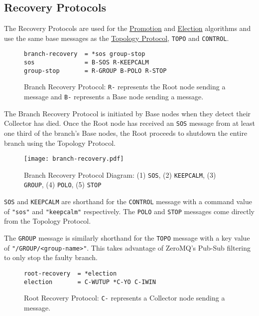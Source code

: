 \subsection{Recovery Protocols}
\label{proto_reco}

The \dcamp Recovery Protocols are used for the \hyperref[algor_promo]{Promotion} and \hyperref[algor_elect]{Election}
algorithms and use the same base messages as the \hyperref[proto_topo]{Topology Protocol}, \texttt{TOPO} and
\texttt{CONTROL}.

\begin{figure}[H]
\vspace{+10pt}
\begin{verbatim}
branch-recovery  = *sos group-stop
sos              = B-SOS R-KEEPCALM
group-stop       = R-GROUP B-POLO R-STOP
\end{verbatim}
\vspace{-5pt}
\caption[Branch Recovery Protocol]
	{Branch Recovery Protocol: \texttt{R-} represents the Root node sending a message and \texttt{B-} represents a
	 Base node sending a message.}
\label{fig:proto_reco_branch_spec}
\end{figure}

The Branch Recovery Protocol is initiated by Base nodes when they detect their Collector has died. Once the Root node
has received an \texttt{SOS} message from at least one third of the branch's Base nodes, the Root proceeds to shutdown
the entire branch using the Topology Protocol.

\begin{figure}[H]
    \centering
    \texttt{[image: branch-recovery.pdf]}
    \label{fig:proto_branch_reco_image}
    \caption[Branch Recovery Protocol Diagram]
            {Branch Recovery Protocol Diagram: (1) \texttt{SOS}, (2) \texttt{KEEPCALM}, (3) \texttt{GROUP}, (4)
	    \texttt{POLO}, (5) \texttt{STOP}}
\end{figure}

\texttt{SOS} and \texttt{KEEPCALM} are shorthand for the \texttt{CONTROL} message with a command value of \texttt{"sos"}
and \texttt{"keepcalm"} respectively. The \texttt{POLO} and \texttt{STOP} messages come directly from the Topology
Protocol.

The \texttt{GROUP} message is similarly shorthand for the \texttt{TOPO} message with a key value of
\texttt{"/GROUP/<group-name>"}. This takes advantage of ZeroMQ's Pub-Sub filtering to only stop the faulty branch.

\begin{figure}[H]
\vspace{+10pt}
\begin{verbatim}
root-recovery  = *election
election       = C-WUTUP *C-YO C-IWIN
\end{verbatim}
\vspace{-5pt}
\caption[Root Recovery Protocol]
        {Root Recovery Protocol: \texttt{C-} represents a Collector node sending a message.}
\label{fig:proto_reco_root_spec}
\end{figure}

